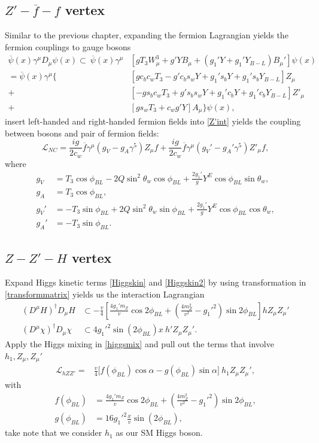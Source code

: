 \documentclass{report}
\newcommand{\nn}{\nonumber}
\numberwithin{equation}{section}
\begin{document}
\subsection{$Z'-\overline{f}-f$ vertex}
Similar to the previous chapter, expanding the fermion Lagrangian yields the fermion couplings to gauge bosons
\begin{align}
\overline{\psi}(x) \gamma^\mu D_\mu \psi(x)\subset \
 \overline{\psi}(x) \gamma^\mu &[g T_3 W_\mu ^3+g' Y B_\mu+ (g_1'  Y+ g_1' Y_{B-L})B_\mu'] \psi(x)\nn\\
 = \overline{\psi}(x)\gamma^\mu \bigg\{ &\left[g c_bc_w T_3-g' c_b s_w Y+g_1'  s_bY+g_1' s_b Y_{B-L}\right] Z_\mu \nn\\
 +&\left[-g s_bc_w T_3+g' s_b s_w Y+g_1'  c_bY+g_1' c_b Y_{B-L}\right] Z'_\mu \nn\\
 +&\left[g s_w T_3+ c_w g' Y\right]A_\mu\bigg\}
  \psi(x)\label{Z'int},
\end{align}
insert left-handed and right-handed fermion fields into \eqref{Z'int} yields the coupling between bosons and pair of fermion fields:
\begin{equation}
\mathcal{L}_{NC}=\frac{ig}{2c_w} \overline{f} \gamma^\mu(g_V-g_A \gamma^5) Z_\mu f+\frac{ig}{2c_w} \overline{f} \gamma^\mu(g_V'-g_A' \gamma^5) Z'_\mu f,
\end{equation}
where
\begin{align}
g_V&=T_3 \cos\phi_{BL}-2Q\sin^2 \theta_w \cos \phi_{BL}+\frac{2  g_1'}{g}Y^E\cos\phi_{BL}\sin\theta_w,\\
g_A&=T_3\cos \phi_{BL},\\
g_V'&=-T_3 \sin\phi_{BL}+2Q\sin^2 \theta_w \sin \phi_{BL}+\frac{2  g_1'}{g}Y^E\cos\phi_{BL}\cos\theta_w,\\
g_A'&=-T_3\sin \phi_{BL}.
\end{align}
\subsection{$Z-Z'-H$ vertex}
Expand Higgs kinetic terms \eqref{Higgskin} and \eqref{Higgskin2} by using transformation in \eqref{transformmatrix} yields us the interaction Lagrangian
\begin{align}
 (D^\mu H)^\dagger D_\mu H&\subset - \frac{v}{4}\left[\frac{4g_1' m_Z}{v}\cos 2\phi_{BL}+\left(\frac{4m^2_Z}{v^2} -g_1'^2\right)\sin 2\phi_{BL}\right] hZ_\mu Z_\mu'\\
  (D^\mu\chi)^\dagger D_\mu\chi &\subset  4 g_1'^2 \sin (2\phi_{BL}) x  \ h' Z_\mu Z_\mu'.
\end{align}
Apply the Higgs mixing in \eqref{higgsmix} and pull out the terms that involve $h_1,Z_\mu,Z_\mu'$
\begin{align}
\mathcal{L}_{hZZ'}=&\frac{v}{4} \big[f(\phi_{BL})\cos \alpha-g(\phi_{BL}) \sin \alpha\big] \ h_1 Z_\mu Z_\mu',
\end{align}
with
\begin{align}
f(\phi_{BL})&=\frac{4g_1'  m_Z}{v}\cos 2\phi_{BL}+\left(\frac{4m^2_Z}{v^2} -g_1'^2\right)\sin 2\phi_{BL},\\
g(\phi_{BL})&= 16 g_1'^2 \frac{x}{v}\sin (2\phi_{BL}),
\end{align}
take note that we consider $h_1$ as our SM Higgs boson. 
\end{document}
